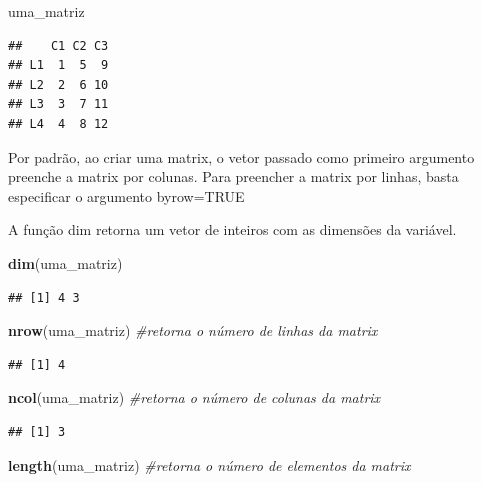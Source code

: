 \documentclass[
]{book}
\newenvironment{Shaded}{\begin{snugshade}}{\end{snugshade}}
\newcommand{\CommentTok}[1]{\textcolor[rgb]{0.56,0.35,0.01}{\textit{#1}}}
\newcommand{\FunctionTok}[1]{\textcolor[rgb]{0.13,0.29,0.53}{\textbf{#1}}}
\newcommand{\NormalTok}[1]{#1}
\begin{document}
\begin{Shaded}
\begin{Highlighting}[]
\NormalTok{uma\_matriz}
\end{Highlighting}
\end{Shaded}

\begin{verbatim}
##    C1 C2 C3
## L1  1  5  9
## L2  2  6 10
## L3  3  7 11
## L4  4  8 12
\end{verbatim}

Por padrão, ao criar uma matrix, o vetor passado como primeiro argumento preenche a matrix por colunas.
Para preencher a matrix por linhas, basta especificar o argumento byrow=TRUE

A função dim retorna um vetor de inteiros com as dimensões da variável.

\begin{Shaded}
\begin{Highlighting}[]
\FunctionTok{dim}\NormalTok{(uma\_matriz)}
\end{Highlighting}
\end{Shaded}

\begin{verbatim}
## [1] 4 3
\end{verbatim}

\begin{Shaded}
\begin{Highlighting}[]
\FunctionTok{nrow}\NormalTok{(uma\_matriz) }\CommentTok{\#retorna o número de linhas da matrix}
\end{Highlighting}
\end{Shaded}

\begin{verbatim}
## [1] 4
\end{verbatim}

\begin{Shaded}
\begin{Highlighting}[]
\FunctionTok{ncol}\NormalTok{(uma\_matriz) }\CommentTok{\#retorna o número de colunas da matrix}
\end{Highlighting}
\end{Shaded}

\begin{verbatim}
## [1] 3
\end{verbatim}

\begin{Shaded}
\begin{Highlighting}[]
\FunctionTok{length}\NormalTok{(uma\_matriz) }\CommentTok{\#retorna o número de elementos da matrix}
\end{Highlighting}
\end{Shaded}
\end{document}
